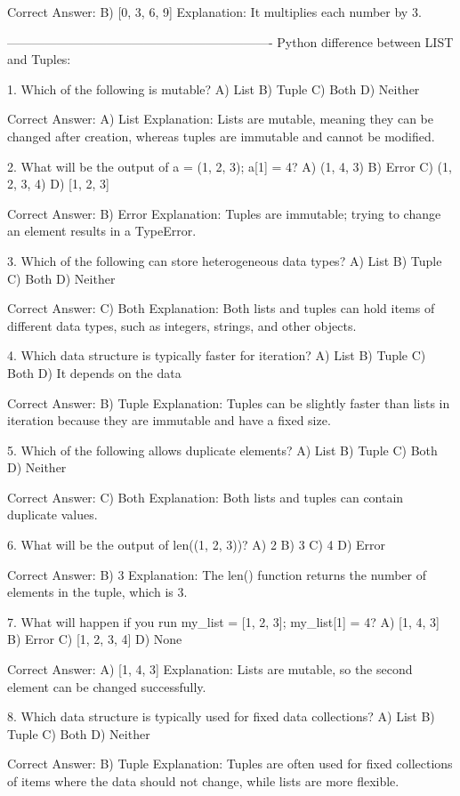 Correct Answer: B) [0, 3, 6, 9]
Explanation: It multiplies each number by 3.

----------------------------------------------------------------
Python difference between LIST and Tuples:

1. Which of the following is mutable?
A) List
B) Tuple
C) Both
D) Neither

Correct Answer: A) List
Explanation: Lists are mutable, meaning they can be changed after creation, whereas tuples are immutable and cannot be modified.

2. What will be the output of a = (1, 2, 3); a[1] = 4?
A) (1, 4, 3)
B) Error
C) (1, 2, 3, 4)
D) [1, 2, 3]

Correct Answer: B) Error
Explanation: Tuples are immutable; trying to change an element results in a TypeError.

3. Which of the following can store heterogeneous data types?
A) List
B) Tuple
C) Both
D) Neither

Correct Answer: C) Both
Explanation: Both lists and tuples can hold items of different data types, such as integers, strings, and other objects.

4. Which data structure is typically faster for iteration?
A) List
B) Tuple
C) Both
D) It depends on the data

Correct Answer: B) Tuple
Explanation: Tuples can be slightly faster than lists in iteration because they are immutable and have a fixed size.

5. Which of the following allows duplicate elements?
A) List
B) Tuple
C) Both
D) Neither

Correct Answer: C) Both
Explanation: Both lists and tuples can contain duplicate values.

6. What will be the output of len((1, 2, 3))?
A) 2
B) 3
C) 4
D) Error

Correct Answer: B) 3
Explanation: The len() function returns the number of elements in the tuple, which is 3.

7. What will happen if you run my_list = [1, 2, 3]; my_list[1] = 4?
A) [1, 4, 3]
B) Error
C) [1, 2, 3, 4]
D) None

Correct Answer: A) [1, 4, 3]
Explanation: Lists are mutable, so the second element can be changed successfully.

8. Which data structure is typically used for fixed data collections?
A) List
B) Tuple
C) Both
D) Neither

Correct Answer: B) Tuple
Explanation: Tuples are often used for fixed collections of items where the data should not change, while lists are more flexible.

